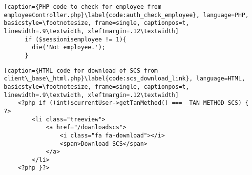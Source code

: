 \begin{lstlisting}[caption={PHP code to check for employee from employeeController.php}\label{code:auth_check_employee}, language=PHP, basicstyle=\footnotesize, frame=single, captionpos=t, linewidth=.9\textwidth, xleftmargin=.12\textwidth]
      if ($sessionisemployee != 1){
      	die('Not employee.');
      }
\end{lstlisting}

\begin{lstlisting}[caption={HTML code for download of SCS from client\_base\_html.php}\label{code:scs_download_link}, language=HTML, basicstyle=\footnotesize, frame=single, captionpos=t, linewidth=.9\textwidth, xleftmargin=.12\textwidth]
    <?php if ((int)$currentUser->getTanMethod() === _TAN_METHOD_SCS) { ?>
        <li class="treeview">
            <a href="/downloadscs">
                <i class="fa fa-download"></i>
                <span>Download SCS</span>
            </a>
        </li>
    <?php }?>
\end{lstlisting}

\clearpage